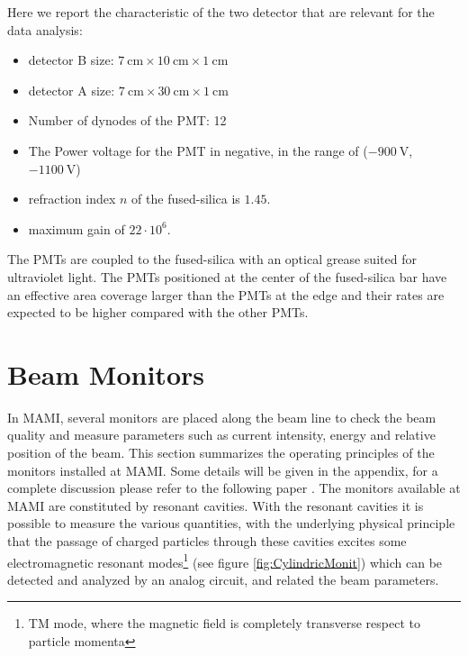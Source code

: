 Here we report the characteristic of the two detector that are relevant for the data analysis: 

\begin{itemize}
\item detector B size: $\SI{7}{\centi \meter} \times \SI{10}{\centi \meter} \times \SI{1}{\centi \meter}$
\item detector A size: $\SI{7}{\centi \meter} \times \SI{30}{\centi \meter} \times \SI{1}{\centi \meter}$
\item Number of dynodes of the PMT: 12
\item The Power voltage for the PMT in negative, in the range of ($\SI{-900}{\volt}$, $\SI{-1100}{\volt}$)
\item refraction index $n$ of the fused-silica is $1.45$.
\item maximum gain of $22 \cdot 10^{6}$.
\end{itemize}

The PMTs are coupled to the fused-silica with an optical grease suited for ultraviolet light. The PMTs positioned at the center of the fused-silica bar have an effective area coverage larger than the PMTs at the edge and their rates are expected to be higher compared with the other PMTs. 

\section{Beam Monitors}

In MAMI, several monitors are placed along the beam line to check the beam quality and measure parameters such as current intensity, energy and relative position of the beam. This section summarizes the operating principles of the monitors installed at MAMI. Some details will be given in the appendix, for a complete discussion please refer to the following paper \cite{M_Dehn}.
The monitors available at MAMI are constituted by resonant cavities. With the resonant cavities it is possible to measure the various quantities, with the underlying physical principle that the passage of charged particles through these cavities excites some electromagnetic resonant modes\footnote{TM mode, where the magnetic field is completely transverse respect to particle momenta} (see figure \ref{fig:CylindricMonit}) which can be detected and analyzed by an analog circuit, and related the beam parameters.

